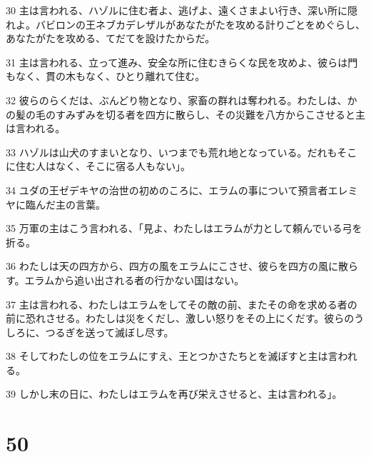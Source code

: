 \par 30 主は言われる、ハゾルに住む者よ、逃げよ、遠くさまよい行き、深い所に隠れよ。バビロンの王ネブカデレザルがあなたがたを攻める計りごとをめぐらし、あなたがたを攻める、てだてを設けたからだ。
\par 31 主は言われる、立って進み、安全な所に住むきらくな民を攻めよ、彼らは門もなく、貫の木もなく、ひとり離れて住む。
\par 32 彼らのらくだは、ぶんどり物となり、家畜の群れは奪われる。わたしは、かの髪の毛のすみずみを切る者を四方に散らし、その災難を八方からこさせると主は言われる。
\par 33 ハゾルは山犬のすまいとなり、いつまでも荒れ地となっている。だれもそこに住む人はなく、そこに宿る人もない」。
\par 34 ユダの王ゼデキヤの治世の初めのころに、エラムの事について預言者エレミヤに臨んだ主の言葉。
\par 35 万軍の主はこう言われる、「見よ、わたしはエラムが力として頼んでいる弓を折る。
\par 36 わたしは天の四方から、四方の風をエラムにこさせ、彼らを四方の風に散らす。エラムから追い出される者の行かない国はない。
\par 37 主は言われる、わたしはエラムをしてその敵の前、またその命を求める者の前に恐れさせる。わたしは災をくだし、激しい怒りをその上にくだす。彼らのうしろに、つるぎを送って滅ぼし尽す。
\par 38 そしてわたしの位をエラムにすえ、王とつかさたちとを滅ぼすと主は言われる。
\par 39 しかし末の日に、わたしはエラムを再び栄えさせると、主は言われる」。

\chapter{50}

